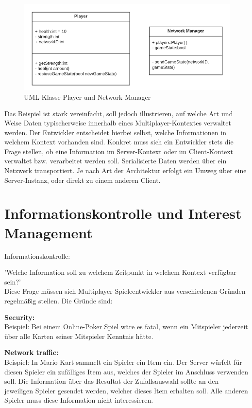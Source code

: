 \begin{figure}[H]
	\centering
	\includegraphics[width=130mm]{images/UML_class_Player_NM.png}
	\caption[UML Klassen]{UML Klasse Player und Network Manager}
	\label{pic:UML_class_Player_NM}
\end{figure}

Das Beispiel ist stark vereinfacht, soll jedoch illustrieren, auf welche Art und Weise Daten typischerweise innerhalb eines Multiplayer-Kontextes verwaltet werden. Der Entwickler entscheidet hierbei selbst, welche Informationen in welchem Kontext vorhanden sind. Konkret muss sich ein Entwickler stets die Frage stellen, ob eine Information im Server-Kontext oder im Client-Kontext verwaltet bzw. verarbeitet werden soll. Serialisierte Daten werden über ein Netzwerk transportiert. Je nach Art der Architektur erfolgt ein Umweg über eine Server-Instanz, oder direkt zu einem anderen Client. \cite{Smed.2002c}

\section{Informationskontrolle und Interest Management}

\textsf{\Large Informationskontrolle:}

'Welche Information soll zu welchem Zeitpunkt in welchem Kontext verfügbar sein?' \\
Diese Frage müssen sich Multiplayer-Spieleentwickler aus verschiedenen Gründen regelmäßig stellen. Die Gründe sind:

\textbf{Security:} \\
Beispiel: Bei einem Online-Poker Spiel wäre es fatal, wenn ein Mitspieler jederzeit über alle Karten seiner Mitspieler Kenntnis hätte. 

\textbf{Network traffic:} \\
Beispiel: In Mario Kart sammelt ein Spieler ein Item ein. Der Server würfelt für diesen Spieler ein zufälliges Item aus, welches der Spieler im Anschluss verwenden soll. Die Information über das Resultat der Zufallsauswahl sollte an den jeweiligen Spieler gesendet werden, welcher dieses Item erhalten soll. Alle anderen Spieler muss diese Information nicht interessieren.
 
